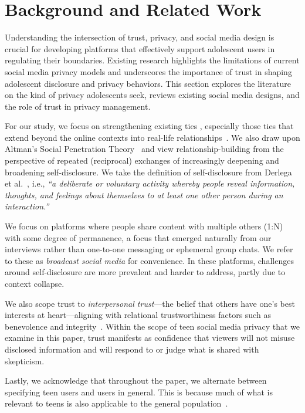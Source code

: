 \section{Background and Related Work}
Understanding the intersection of trust, privacy, and social media design is crucial for developing platforms that effectively support adolescent users in regulating their boundaries. Existing research highlights the limitations of current social media privacy models and underscores the importance of trust in shaping adolescent disclosure and privacy behaviors. This section explores the literature on the kind of privacy adolescents seek, reviews existing social media designs, and the role of trust in privacy management.

For our study, we focus on strengthening existing ties , especially those ties that extend beyond the online contexts into real-life relationships~\cite{Nguyen2012-cc}. We also draw upon Altman's Social Penetration Theory~\cite{altman1973social} and view relationship-building from the perspective of repeated (reciprocal) exchanges of increasingly deepening and broadening self-disclosure. We take the definition of self-disclosure from Derlega et al.~\cite{derlega1993self}, i.e., \textit{``a deliberate or voluntary activity whereby people reveal information, thoughts, and feelings about themselves to at least one other person during an interaction.''} 

We focus on platforms where people share content with multiple others (1:N) with some degree of permanence, a focus that emerged naturally from our interviews rather than one-to-one messaging or ephemeral group chats. We refer to these as \textit{broadcast social media} for convenience. In these platforms, challenges around self-disclosure are more prevalent and harder to address, partly due to context collapse. 

We also scope trust to \textit{interpersonal trust}---the belief that others have one's best interests at heart---aligning with relational trustworthiness factors such as benevolence and integrity~\cite{Nguyen2009-ri}. Within the scope of teen social media privacy that we examine in this paper, trust manifests as confidence that viewers will not misuse disclosed information and will respond to or judge what is shared with skepticism.

Lastly, we acknowledge that throughout the paper, we alternate between specifying teen users and users in general. This is because much of what is relevant to teens is also applicable to the general population~\cite{Christofides-2012-HeyMomAdults-o}.



